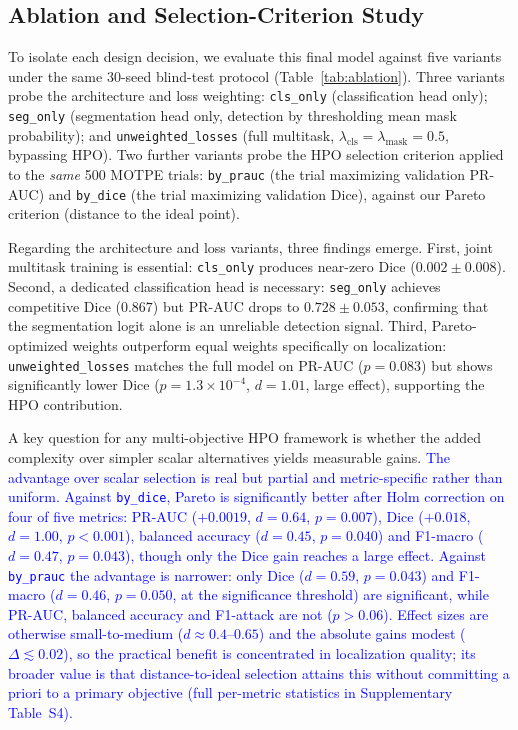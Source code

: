 \documentclass[final,5p,times,twocolumn,number]{elsarticle}
\newcommand{\rev}[1]{#1}
\newcommand{\revB}[1]{\textcolor{blue}{#1}}
\begin{document}
\subsection{Ablation and Selection-Criterion Study}
\label{subsec:ablation}

To isolate each design decision, we evaluate this final model against five
variants under the same 30-seed blind-test protocol
(Table~\ref{tab:ablation}). Three variants probe the architecture and loss
weighting: \texttt{cls\_only} (classification head only); \texttt{seg\_only}
(segmentation head only, detection by thresholding mean mask probability);
and \texttt{unweighted\_losses} (full multitask, $\lambda_{\text{cls}} =
\lambda_{\text{mask}} = 0.5$, bypassing HPO). \rev{Two further variants probe
the HPO selection criterion applied to the \emph{same} 500 MOTPE trials:
\texttt{by\_prauc} (the trial maximizing validation PR-AUC) and
\texttt{by\_dice} (the trial maximizing validation Dice), against our Pareto
criterion (distance to the ideal point).}

Regarding the architecture and loss variants, three findings emerge.
First, joint multitask training is essential:
\texttt{cls\_only} produces near-zero Dice ($0.002 \pm 0.008$). Second, a
dedicated classification head is necessary: \texttt{seg\_only} achieves
competitive Dice ($0.867$) but PR-AUC drops to $0.728 \pm 0.053$, confirming
that the segmentation logit alone is an unreliable detection signal. Third,
Pareto-optimized weights outperform equal weights specifically on localization:
\texttt{unweighted\_losses} matches the full model on PR-AUC ($p = 0.083$) but
shows significantly lower Dice ($p = 1.3 \times 10^{-4}$, $d = 1.01$, large
effect), supporting the HPO contribution.

A key question for any multi-objective HPO framework is whether the added
complexity over simpler scalar alternatives yields measurable gains. \revB{The
advantage over scalar selection is real but partial and metric-specific rather
than uniform. Against \texttt{by\_dice}, Pareto is significantly better after Holm
correction on four of five metrics: PR-AUC ($+0.0019$, $d=0.64$, $p=0.007$), Dice
($+0.018$, $d=1.00$, $p<0.001$), balanced accuracy ($d=0.45$, $p=0.040$) and
F1-macro ($d=0.47$, $p=0.043$), though only the Dice gain reaches a large effect.
Against \texttt{by\_prauc} the advantage is narrower: only Dice ($d=0.59$,
$p=0.043$) and F1-macro ($d=0.46$, $p=0.050$, at the significance threshold) are
significant, while PR-AUC, balanced accuracy and F1-attack are not ($p>0.06$).
Effect sizes are otherwise small-to-medium ($d\approx0.4$--$0.65$) and the
absolute gains modest ($\Delta\lesssim0.02$), so the practical benefit is
concentrated in localization quality; its broader value is that distance-to-ideal
selection attains this without committing a priori to a primary objective (full
per-metric statistics in Supplementary Table~S4).}
\end{document}
